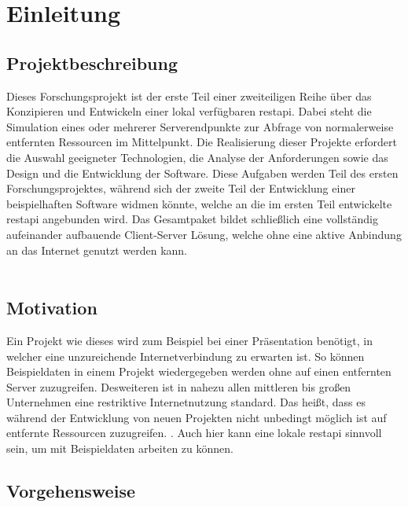 \chapter{Einleitung} \label{chp:introduction}

\section{Projektbeschreibung} \label{sec:purpose}

Dieses Forschungsprojekt ist der erste Teil einer zweiteiligen Reihe über das Konzipieren und Entwickeln einer lokal verfügbaren \gls{restapi}. Dabei steht die Simulation eines oder mehrerer Serverendpunkte zur Abfrage von normalerweise entfernten Ressourcen im Mittelpunkt. Die Realisierung dieser Projekte erfordert die Auswahl geeigneter Technologien, die Analyse der Anforderungen sowie das Design und die Entwicklung der Software. Diese Aufgaben werden Teil des ersten Forschungsprojektes, während sich der zweite Teil der Entwicklung einer beispielhaften Software widmen könnte, welche an die im ersten Teil entwickelte \gls{restapi} angebunden wird. Das Gesamtpaket bildet schließlich eine vollständig aufeinander aufbauende Client-Server Lösung, welche ohne eine aktive Anbindung an das Internet genutzt werden kann. \\
\\ 
\section{Motivation} \label{sec:motivation}

Ein Projekt wie dieses wird zum Beispiel bei einer Präsentation benötigt, in welcher eine unzureichende Internetverbindung zu erwarten ist. So können Beispieldaten in einem Projekt wiedergegeben werden ohne auf einen entfernten Server zuzugreifen. 
Desweiteren ist in nahezu allen mittleren bis großen Unternehmen eine restriktive Internetnutzung standard. Das heißt, dass es während der Entwicklung von neuen Projekten nicht unbedingt möglich ist auf entfernte Ressourcen zuzugreifen. \cite{Hunt.1998}. Auch hier kann eine lokale \gls{restapi} sinnvoll sein, um mit Beispieldaten arbeiten zu können. 

\section{Vorgehensweise} \label{sec:approach}

